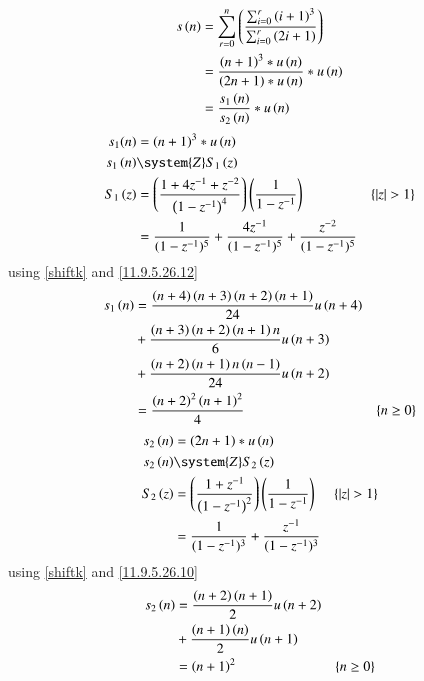 \documentclass[journal,12pt,twocolumn]{article}
\begin{document}
\begin{align}
    s\left(n\right) & = \sum_{r=0}^{n}\left(\frac{\sum_{i=0}^{r} \left(i+1\right)^{3}}{\sum_{i=0}^{r} \left(2i+1\right)}\right) \\
    & = \frac{\left(n+1\right)^3 * u\left(n\right)}{\left(2n+1\right) * u\left(n\right)} * u\left(n\right) \\
    & = \frac{s_1\left(n\right)}{s_2\left(n\right)} * u\left(n\right)\label{9.5.25.1}
\end{align}
\begin{align}
    s_1(n) & = \brak{n+1}^{3} * u\brak{n}\\
    s_1\brak{n} & \system{Z} S_1\brak{z}\\
    S_1\brak{z} & = \brak{\frac{1 + 4z^{-1} + z^{-2}}{\brak{1-z^{-1}}^4}} \brak{\frac{1}{1-z^{-1}}} & \cbrak{|z| > 1}\\
    & = \frac{1}{(1 - z^{-1})^5} + \frac{4 z^{-1}}{(1 - z^{-1})^5} + \frac{z^{-2}}{(1 - z^{-1})^5}
\end{align}
using \eqref{shiftk} and \eqref{11.9.5.26.12}
\begin{align}
    s_1\left(n\right) & = \frac{\left(n + 4\right) \left(n + 3\right) \left(n + 2\right) \left(n + 1\right)}{24}u\left(n+4\right)\notag\\
    & + \frac{\left(n + 3\right) \left(n + 2\right) \left(n + 1\right) n}{6}u\left(n+3\right)\notag\\
    & + \frac{\left(n + 2\right) \left(n + 1\right) n \left(n - 1\right)}{24}u\left(n+2\right)\\
    & = \frac{\left(n+2\right)^2\left(n+1\right)^2}{4} & \left\{n\geq0\right\}\label{9.5.25.2}
\end{align}
\begin{align}
    s_2\brak{n} & = \brak{2n+1} * u\brak{n}\\
    s_2\brak{n} & \system{Z} S_2\brak{z}\\
    S_2\brak{z} & = \brak{\frac{1 + z^{-1}}{\brak{1-z^{-1}}^2}} \brak{\frac{1}{1-z^{-1}}} & \cbrak{|z| > 1}\\
    & = \frac{1}{(1 - z^{-1})^3} + \frac{z^{-1}}{(1 - z^{-1})^3}
\end{align}
using \eqref{shiftk} and \eqref{11.9.5.26.10}
\begin{align}
    s_2\left(n\right) & = \frac{\left(n + 2\right) \left(n + 1\right)}{2}u\left(n+2\right)\notag\\
    & + \frac{\left(n + 1\right) \left(n\right) }{2}u\left(n+1\right)\\
    & = \left(n+1\right)^2 & \left\{n\geq0\right\} \label{9.5.25.3}
\end{align}
\end{document}
